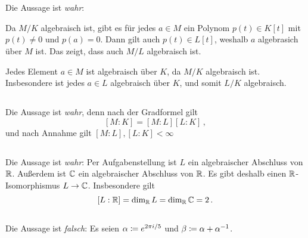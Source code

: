 \section{}





\subsection{}

Die Aussage ist \emph{wahr}:

Da $M/K$ algebraisch ist, gibt es für jedes $a \in M$ ein Polynom $p(t) \in K[t]$ mit $p(t) \neq 0$ und $p(a) = 0$.
Dann gilt auch $p(t) \in L[t]$, weshalb $a$ algebrasich über $M$ ist.
Das zeigt, dass auch $M/L$ algebraisch ist.

Jedes Element $a \in M$ ist algebraisch über $K$, da $M/K$ algebraisch ist.
Insbesondere ist jedes $a \in L$ algebraisch über $K$, und somit $L/K$ algebraisch.





\subsection{}

Die Aussage ist \emph{wahr}, denn nach der Gradformel gilt
\[
    [M : K]
  = [M : L][L : K] \,,
\]
und nach Annahme gilt $[M : L], [L : K] < \infty$





\subsection{}

Die Aussage ist \emph{wahr}:
Per Aufgabenstellung ist $L$ ein algebraischer Abschluss von $\mathbb{R}$.
Außerdem ist $\mathbb{C}$ ein algebraischer Abschluss von $\mathbb{R}$.
Es gibt deshalb einen $\mathbb{R}$-Isomorphismus $L \to \mathbb{C}$.
Insbesondere gilt
\[
    [L : \mathbb{R}]
  = \dim_{\mathbb{R}} L
  = \dim_{\mathbb{R}} \mathbb{C}
  = 2 \,.
\]





\subsection{}

Die Aussage ist \emph{falsch}:
Es seien $\alpha \coloneqq e^{2 \pi i / 5}$ und $\beta \coloneqq \alpha + \alpha^{-1}$.


